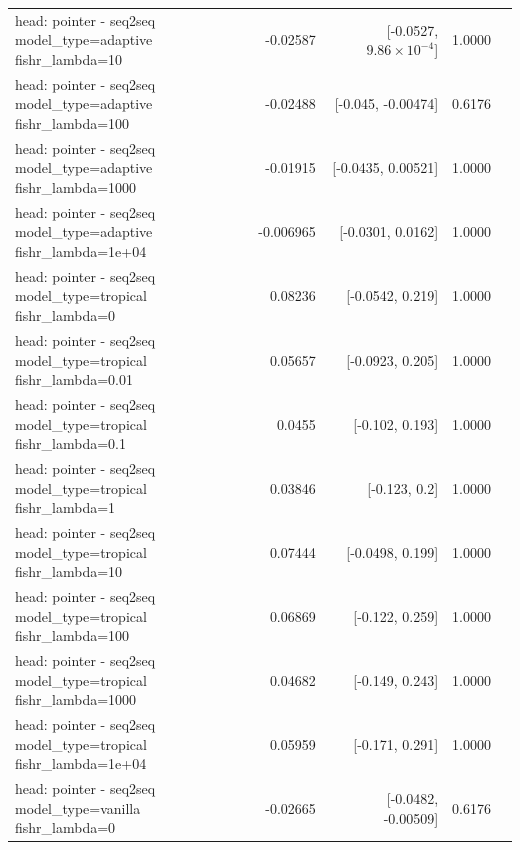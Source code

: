 \documentclass[10pt]{article}
\makeatletter
\newcommand{\stackcell}[1]{\begin{tabular}[t]{@{}l@{}}#1\end{tabular}}
\makeatother
\begin{document}
{\begin{longtable}{lrrrl}
\stackcell{head: pointer - seq2seq\\\footnotesize model\_type=adaptive fishr\_lambda=10 } & -0.02587 & [-0.0527, $9.86\times10^{-4}$] & 1.0000 & \\
\stackcell{head: pointer - seq2seq\\\footnotesize model\_type=adaptive fishr\_lambda=100 } & -0.02488 & [-0.045, -0.00474] & 0.6176 & \\
\stackcell{head: pointer - seq2seq\\\footnotesize model\_type=adaptive fishr\_lambda=1000 } & -0.01915 & [-0.0435, 0.00521] & 1.0000 & \\
\stackcell{head: pointer - seq2seq\\\footnotesize model\_type=adaptive fishr\_lambda=1e+04 } & -0.006965 & [-0.0301, 0.0162] & 1.0000 & \\
\stackcell{head: pointer - seq2seq\\\footnotesize model\_type=tropical fishr\_lambda=0 } & 0.08236 & [-0.0542, 0.219] & 1.0000 & \\
\stackcell{head: pointer - seq2seq\\\footnotesize model\_type=tropical fishr\_lambda=0.01 } & 0.05657 & [-0.0923, 0.205] & 1.0000 & \\
\stackcell{head: pointer - seq2seq\\\footnotesize model\_type=tropical fishr\_lambda=0.1 } & 0.0455 & [-0.102, 0.193] & 1.0000 & \\
\stackcell{head: pointer - seq2seq\\\footnotesize model\_type=tropical fishr\_lambda=1 } & 0.03846 & [-0.123, 0.2] & 1.0000 & \\
\stackcell{head: pointer - seq2seq\\\footnotesize model\_type=tropical fishr\_lambda=10 } & 0.07444 & [-0.0498, 0.199] & 1.0000 & \\
\stackcell{head: pointer - seq2seq\\\footnotesize model\_type=tropical fishr\_lambda=100 } & 0.06869 & [-0.122, 0.259] & 1.0000 & \\
\stackcell{head: pointer - seq2seq\\\footnotesize model\_type=tropical fishr\_lambda=1000 } & 0.04682 & [-0.149, 0.243] & 1.0000 & \\
\stackcell{head: pointer - seq2seq\\\footnotesize model\_type=tropical fishr\_lambda=1e+04 } & 0.05959 & [-0.171, 0.291] & 1.0000 & \\
\stackcell{head: pointer - seq2seq\\\footnotesize model\_type=vanilla fishr\_lambda=0 } & -0.02665 & [-0.0482, -0.00509] & 0.6176 & \\

\end{longtable}}
\end{document}

